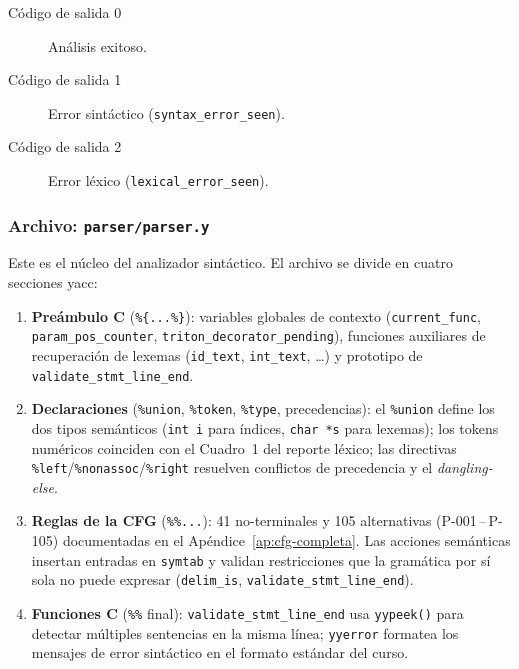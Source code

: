 \begin{description}
  \item[Código de salida 0] Análisis exitoso.
  \item[Código de salida 1] Error sintáctico (\texttt{syntax\_error\_seen}).
  \item[Código de salida 2] Error léxico (\texttt{lexical\_error\_seen}).
\end{description}



\subsubsection{Archivo: \texttt{parser/parser.y}}

Este es el núcleo del analizador sintáctico. El archivo se divide en cuatro
secciones yacc:

\begin{enumerate}
  \item \textbf{Preámbulo C} (\texttt{\%\{...\%\}}): variables globales de
    contexto (\texttt{current\_func}, \texttt{param\_pos\_counter},
    \texttt{triton\_decorator\_pending}), funciones auxiliares de recuperación de
    lexemas (\texttt{id\_text}, \texttt{int\_text}, \ldots) y prototipo de
    \texttt{validate\_stmt\_line\_end}.

  \item \textbf{Declaraciones} (\texttt{\%union}, \texttt{\%token}, \texttt{\%type},
    precedencias): el \texttt{\%union} define los dos tipos semánticos
    (\texttt{int i} para índices, \texttt{char *s} para lexemas); los tokens
    numéricos coinciden con el Cuadro~1 del reporte léxico; las directivas
    \texttt{\%left}/\texttt{\%nonassoc}/\texttt{\%right} resuelven conflictos
    de precedencia y el \textit{dangling-else}.

  \item \textbf{Reglas de la CFG} (\texttt{\%\%...}): 41 no-terminales y 105
    alternativas (P-001\,--\,P-105) documentadas en el Apéndice~\ref{ap:cfg-completa}.
    Las acciones semánticas insertan entradas en \texttt{symtab} y validan
    restricciones que la gramática por sí sola no puede expresar
    (\texttt{delim\_is}, \texttt{validate\_stmt\_line\_end}).

  \item \textbf{Funciones C} (\texttt{\%\%} final): \texttt{validate\_stmt\_line\_end}
    usa \texttt{yypeek()} para detectar múltiples sentencias en la misma línea;
    \texttt{yyerror} formatea los mensajes de error sintáctico en el formato
    estándar del curso.
\end{enumerate}

